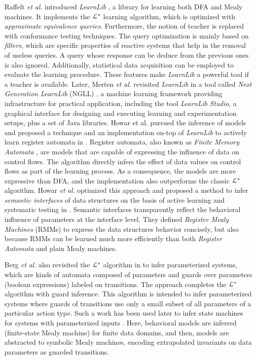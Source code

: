 Raffelt \emph{et al.} introduced \textit{LearnLib}
\cite{Raffelt:2005:LLA:1081180.1081189}, a library for learning
both DFA and Mealy machines. It implements the $\EuScript{L}^*$
\cite{Angluin198787} learning algorithm, which is optimized with
\textit{approximate equivalence queries}. Furthermore, the
notion of teacher is replaced with conformance testing
techniques. The query optimization is mainly based on
\textit{filters}, which are specific properties of reactive
systems that help in the removal of useless queries. A query
whose response can be deduce from the previous ones is also
ignored. Additionally, statistical data acquisition can be
employed to evaluate the learning procedure. These features make
\textit{LearnLib} a powerful tool if a teacher is available.
Later, Merten \emph{et al.} revisited \textit{LearnLib} in a tool called
\textit{Next Generation LearnLib} (NGLL) \cite{ngll11}, a machine
learning framework providing infrastructure for practical
application, including the tool \textit{LearnLib Studio}, a
graphical interface for designing and executing learning and
experimentation setups, plus a set of Java libraries. Howar et
al. pursued the inference of models  and proposed a technique and
an implementation on-top of \textit{LearnLib} to actively learn
register automata in \cite{howarRA2012}. Register automata, also
known as \textit{Finite Memory Automata} \cite{Kaminski1994329},
are models that are capable of expressing the influence of data
on control flows. The algorithm directly infers the effect of
data values on control flows as part of the learning process. As
a consequence, the models are more expressive than DFA, and the
implementation also outperforms the classic $\EuScript{L}^*$
algorithm. Howar \emph{et al.} optimized this
approach and proposed a method to infer \textit{semantic
interfaces} of data structures on the basis of active learning
and systematic testing in \cite{howar2012}. Semantic interfaces
transparently reflect the behavioral influence of parameters at
the interface level.  They defined \textit{Register Mealy
Machines} (RMMs) to express the data structures behavior
concisely, but also because RMMs can be learned much more
efficiently than both \textit{Register Automata} and plain Mealy
machines.

Berg \emph{et al.} also revisited the $\EuScript{L}^*$ algorithm in
\cite{regularinfBerg06} to infer parameterized systems, which are
kinds of automata composed of parameters and guards over
parameters (boolean expressions) labeled on transitions. The
approach completes the  $\EuScript{L}^*$ algorithm with guard
inference. This algorithm is intended to infer parameterized
systems where guards of transitions use only a small subset of
all parameters of a particular action type. Such a work has been
used later to infer state machines for systems with parameterized
inputs \cite{regularinfBerg08}. Here, behavioral models are
inferred (finite-state Mealy machine) for finite data domains,
and then, models are abstracted to symbolic Mealy machines,
encoding extrapolated invariants on data parameters as guarded
transitions.

